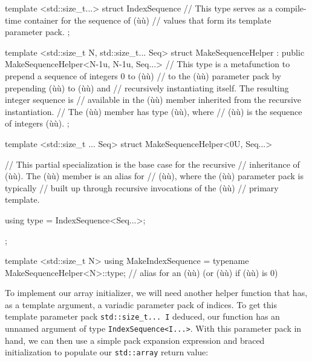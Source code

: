 \begin{emcppslisting}[emcppsbatch=e14]
template <std::size_t...>
struct IndexSequence
{
    // This type serves as a compile-time container for the sequence of (ù{}ù)
    // values that form its template parameter pack.
};

template <std::size_t N, std::size_t... Seq>
struct MakeSequenceHelper : public MakeSequenceHelper<N-1u, N-1u, Seq...>
{
    // This type is a metafunction to prepend a sequence of integers 0 to (ù{}ù)
    // to the (ù{}ù) parameter pack by prepending (ù{}ù) to (ù{}ù) and
    // recursively instantiating itself.  The resulting integer sequence is
    // available in the (ù{}ù) member inherited from the recursive instantiation.
    // The (ù{}ù) member has type (ù{}ù), where
    // (ù{}ù) is the sequence of integers (ù{}ù).
};

template <std::size_t ... Seq>
struct MakeSequenceHelper<0U, Seq...>
{
    // This partial specialization is the base case for the recursive
    // inheritance of (ù{}ù).  The (ù{}ù) member is an alias for
    // (ù{}ù), where the (ù{}ù) parameter pack is typically
    // built up through recursive invocations of the (ù{}ù)
    // primary template.

    using type = IndexSequence<Seq...>;
};

template <std::size_t N>
using MakeIndexSequence = typename MakeSequenceHelper<N>::type;
    // alias for an (ù{}ù) (or (ù{}ù) if (ù{}ù) is 0)
\end{emcppslisting}


\noindent To implement our array initializer, we will need another helper function
that has, as a template argument, a variadic parameter pack of indices.
To get this template parameter pack \lstinline!std::size_t...!~\lstinline!I!
deduced, our function has an unnamed argument of type
\lstinline!IndexSequence<I...>!. With this parameter pack in hand, we can
then use a simple pack expansion expression and braced initialization to
populate our \lstinline!std::array! return value:

